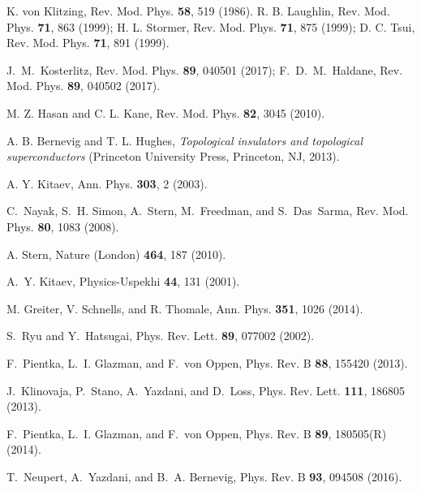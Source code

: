 \documentclass[pra,twocolumn,
superscriptaddress,
showpacs,
aps
]{revtex4-1}
\begin{document}
\begin{thebibliography}{66}
	
K. von Klitzing, Rev. Mod. Phys. {\bf 58}, 519 (1986).
R. B. Laughlin, Rev. Mod. Phys. {\bf 71}, 863 (1999); 
H. L. Stormer, Rev. Mod. Phys. {\bf 71}, 875 (1999);
D. C. Tsui, Rev. Mod. Phys. {\bf 71}, 891 (1999).

J.~M.~Kosterlitz, Rev. Mod. Phys. {\bf89}, 040501 (2017);
F.~D.~M.~Haldane, Rev. Mod. Phys. {\bf 89}, 040502 (2017).

M. Z. Hasan and C. L. Kane, Rev. Mod. Phys. {\bf 82}, 3045
(2010).

A. B. Bernevig and T. L. Hughes, {\it Topological insulators
and topological superconductors} (Princeton University
Press, Princeton, NJ, 2013).
		
A. Y. Kitaev, Ann. Phys. {\bf 303}, 2 (2003).

	C.~Nayak, S.~H. Simon, A.~Stern, M.~Freedman, and S.~Das~Sarma, Rev. Mod. Phys.
	\textbf{80}, 1083 (2008).
	
	A. Stern, Nature (London) {\bf464}, 187 (2010).
	
	A.~Y. Kitaev, Physics-Uspekhi \textbf{44}, 131 (2001).
	

M. Greiter, V. Schnells, and R. Thomale, Ann. Phys. {\bf 351}, 1026 (2014).	
	
	S.~Ryu and Y.~Hatsugai, Phys. Rev. Lett. {\bf89}, 077002 (2002).
	
	F.~Pientka, L.~I. Glazman, and F.~von Oppen, Phys. Rev. B \textbf{88}, 155420
	(2013).
	
	J.~Klinovaja, P.~Stano, A.~Yazdani, and D.~Loss, Phys. Rev. Lett.
	\textbf{111}, 186805 (2013).
	
	F.~Pientka, L.~I. Glazman, and F.~von Oppen, Phys. Rev. B \textbf{89},
	180505(R) (2014).
	
	T.~Neupert, A.~Yazdani, and B.~A. Bernevig, Phys. Rev. B \textbf{93}, 094508
	(2016).


\end{thebibliography}
\end{document}
